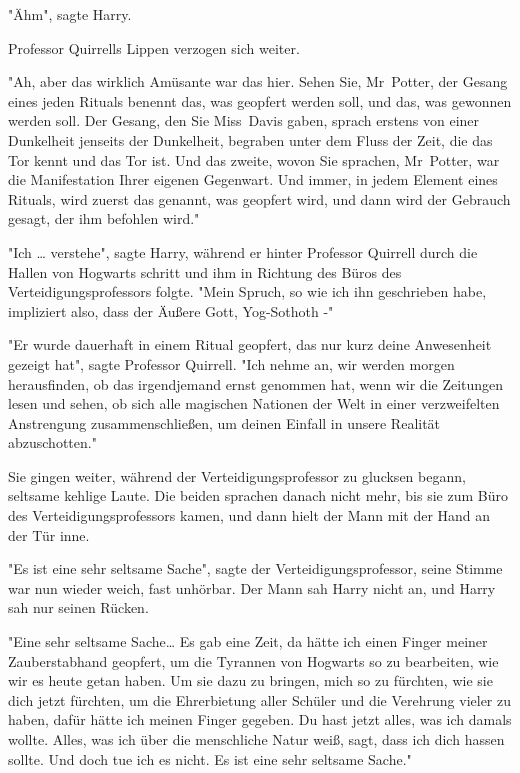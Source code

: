{"Ähm", sagte Harry.

Professor Quirrells Lippen verzogen sich weiter.

"Ah, aber das wirklich Amüsante war das hier. Sehen Sie, Mr~Potter, der Gesang eines jeden Rituals benennt das, was geopfert werden soll, und das, was gewonnen werden soll. Der Gesang, den Sie Miss~Davis gaben, sprach erstens von einer Dunkelheit jenseits der Dunkelheit, begraben unter dem Fluss der Zeit, die das Tor kennt und das Tor ist. Und das zweite, wovon Sie sprachen, Mr~Potter, war die Manifestation Ihrer eigenen Gegenwart. Und immer, in jedem Element eines Rituals, wird zuerst das genannt, was geopfert wird, und dann wird der Gebrauch gesagt, der ihm befohlen wird."

"Ich … verstehe", sagte Harry, während er hinter Professor Quirrell durch die Hallen von Hogwarts schritt und ihm in Richtung des Büros des Verteidigungsprofessors folgte. "Mein Spruch, so wie ich ihn geschrieben habe, impliziert also, dass der Äußere Gott, Yog-Sothoth -"

"Er wurde dauerhaft in einem Ritual geopfert, das nur kurz deine Anwesenheit gezeigt hat", sagte Professor Quirrell. "Ich nehme an, wir werden morgen herausfinden, ob das irgendjemand ernst genommen hat, wenn wir die Zeitungen lesen und sehen, ob sich alle magischen Nationen der Welt in einer verzweifelten Anstrengung zusammenschließen, um deinen Einfall in unsere Realität abzuschotten."

Sie gingen weiter, während der Verteidigungsprofessor zu glucksen begann, seltsame kehlige Laute. Die beiden sprachen danach nicht mehr, bis sie zum Büro des Verteidigungsprofessors kamen, und dann hielt der Mann mit der Hand an der Tür inne.

"Es ist eine sehr seltsame Sache", sagte der Verteidigungsprofessor, seine Stimme war nun wieder weich, fast unhörbar. Der Mann sah Harry nicht an, und Harry sah nur seinen Rücken.

"Eine sehr seltsame Sache… Es gab eine Zeit, da hätte ich einen Finger meiner Zauberstabhand geopfert, um die Tyrannen von Hogwarts so zu bearbeiten, wie wir es heute getan haben. Um sie dazu zu bringen, mich so zu fürchten, wie sie dich jetzt fürchten, um die Ehrerbietung aller Schüler und die Verehrung vieler zu haben, dafür hätte ich meinen Finger gegeben. Du hast jetzt alles, was ich damals wollte. Alles, was ich über die menschliche Natur weiß, sagt, dass ich dich hassen sollte. Und doch tue ich es nicht. Es ist eine sehr seltsame Sache."

}
